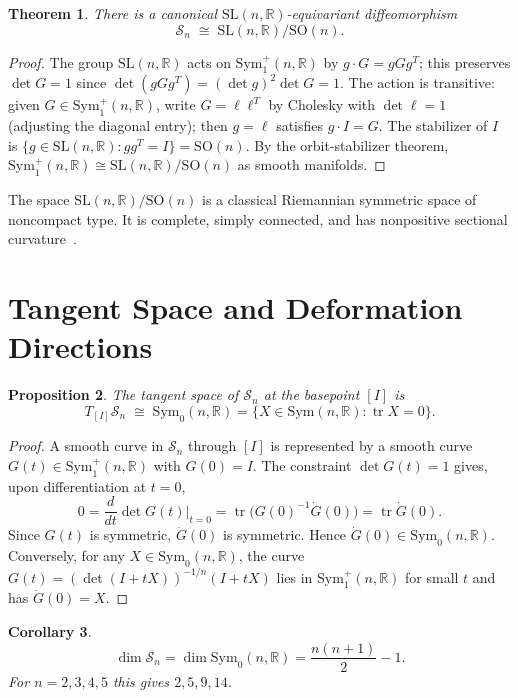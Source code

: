 \documentclass[12pt]{article}
\newtheorem{theorem}{Theorem}[section]
\newtheorem{proposition}[theorem]{Proposition}
\newtheorem{corollary}[theorem]{Corollary}
\theoremstyle{definition}
\theoremstyle{remark}
\newcommand{\R}{\mathbb{R}}
\newcommand{\SL}{\mathrm{SL}}
\newcommand{\SO}{\mathrm{SO}}
\newcommand{\Sym}{\mathrm{Sym}}
\newcommand{\Symp}{\mathrm{Sym}^{+}}
\newcommand{\Symz}{\mathrm{Sym}_{0}}
\newcommand{\calM}{\mathcal{S}}
\newcommand{\tr}{\operatorname{tr}}
\begin{document}
\begin{theorem}
\label{thm:symspace}
There is a canonical $\SL(n,\R)$-equivariant diffeomorphism
\[
  \calM_n \;\cong\; \SL(n,\R)/\SO(n).
\]
\end{theorem}

\begin{proof}
The group $\SL(n,\R)$ acts on $\Symp_1(n,\R)$ by $g \cdot G = gGg^T$;
this preserves $\det G = 1$ since $\det(gGg^T) = (\det g)^2 \det G = 1$.
The action is transitive: given $G \in \Symp_1(n,\R)$, write
$G = \ell \ell^T$ by Cholesky with $\det\ell = 1$ (adjusting the
diagonal entry); then $g = \ell$ satisfies $g \cdot I = G$.
The stabilizer of $I$ is $\{g \in \SL(n,\R) : gg^T = I\} = \SO(n)$.
By the orbit-stabilizer theorem, $\Symp_1(n,\R) \cong \SL(n,\R)/\SO(n)$
as smooth manifolds.
\end{proof}

The space $\SL(n,\R)/\SO(n)$ is a classical Riemannian symmetric space
of noncompact type.
It is complete, simply connected, and has nonpositive sectional
curvature~\cite{Helgason}.

\section{Tangent Space and Deformation Directions}
\label{sec:tangent}

\begin{proposition}
\label{prop:tangent}
The tangent space of $\calM_n$ at the basepoint $[I]$ is
\[
  T_{[I]}\calM_n \;\cong\; \Symz(n,\R)
  = \{X \in \Sym(n,\R) : \tr X = 0\}.
\]
\end{proposition}

\begin{proof}
A smooth curve in $\calM_n$ through $[I]$ is represented by a smooth
curve $G(t) \in \Symp_1(n,\R)$ with $G(0) = I$.
The constraint $\det G(t) = 1$ gives, upon differentiation at $t=0$,
\[
  0 = \frac{d}{dt}\det G(t)\big|_{t=0}
    = \tr\!\bigl(G(0)^{-1}\dot{G}(0)\bigr)
    = \tr \dot{G}(0).
\]
Since $G(t)$ is symmetric, $\dot{G}(0)$ is symmetric.
Hence $\dot{G}(0) \in \Symz(n,\R)$.
Conversely, for any $X \in \Symz(n,\R)$, the curve
$G(t) = (\det(I + tX))^{-1/n}(I + tX)$ lies in $\Symp_1(n,\R)$
for small $t$ and has $\dot{G}(0) = X$.
\end{proof}

\begin{corollary}
\label{cor:dim}
\[
  \dim \calM_n = \dim \Symz(n,\R) = \frac{n(n+1)}{2} - 1.
\]
For $n = 2, 3, 4, 5$ this gives $2, 5, 9, 14$.
\end{corollary}
\end{document}
